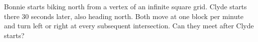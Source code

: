 Bonnie starts biking north from a vertex of an infinite square grid. Clyde starts there 30 seconds later, also heading north. Both move at one block per minute and turn left or right at every subsequent intersection. Can they meet after Clyde starts?
